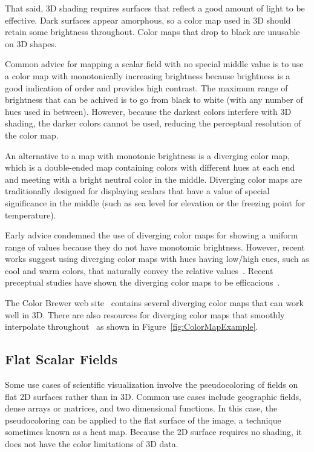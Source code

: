 \documentclass[letterpaper,twocolumn,fleqn]{article}
\newcommand*{\lcite}[1]{~\cite{#1}}
\begin{document}
That said, 3D shading requires surfaces that reflect a good amount of light
to be effective. Dark surfaces appear amorphous, so a color map used in 3D
should retain some brightness throughout. Color maps that drop to black are
unusable on 3D shapes.

Common advice for mapping a scalar field with no special middle value is to
use a color map with monotonically increasing brightness because brightness
is a good indication of order and provides high contrast. The maximum range
of brightness that can be achived is to go from black to white (with any
number of hues used in between). However, because the darkest colors
interfere with 3D shading, the darker colors cannot be used, reducing the
perceptual resolution of the color map.

An alternative to a map with monotonic brightness is a diverging color map,
which is a double-ended map containing colors with different hues at each
end and meeting with a bright neutral color in the middle. Diverging color
maps are traditionally designed for displaying scalars that have a value of
special significance in the middle (such as sea level for elevation or the
freezing point for temperature).

Early advice condemned the use of diverging color maps for showing a
uniform range of values because they do not have monotomic brightness.
However, recent works suggest using diverging color maps with hues having
low/high cues, such as cool and warm colors, that naturally convey the
relative values\lcite{Moreland2009}. Recent preceptual studies have shown
the diverging color maps to be efficacious\lcite{Borkin2011,Samsel2015}.

The Color Brewer web site\lcite{ColorBrewerURL} contains several diverging color
maps that can work well in 3D. There are also resources for diverging color
maps that smoothly interpolate throughout\lcite{DivergingColorMapURL} as
shown in Figure~\ref{fig:ColorMapExample}.

\subsection{Flat Scalar Fields}

\noindent
Some use cases of scientific visualization involve the pseudocoloring of
fields on flat 2D surfaces rather than in 3D. Common use cases include
geographic fields, dense arrays or matrices, and two dimensional functions.
In this case, the pseudocoloring can be applied to the flat surface of the
image, a technique sometimes known as a heat map. Because the 2D surface
requires no shading, it does not have the color limitations of 3D data.
\end{document}
